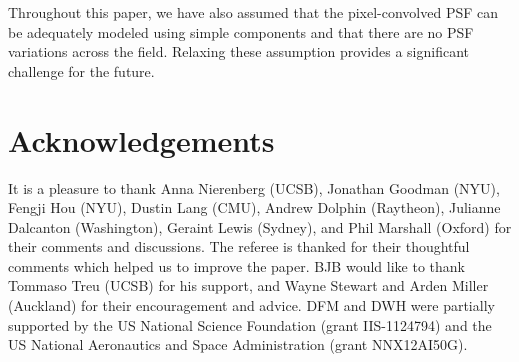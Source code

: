 \documentclass[12pt, preprint]{aastex}
\begin{document}
Throughout this paper, we have also assumed that the pixel-convolved PSF can
be adequately modeled using simple components and that there are no PSF
variations across the field. Relaxing these assumption provides a significant
challenge for the future.



\section{Acknowledgements}
It is a pleasure to thank
  Anna Nierenberg (UCSB),
  Jonathan Goodman (NYU),
  Fengji Hou (NYU),
  Dustin Lang (CMU),
  Andrew Dolphin (Raytheon),
  Julianne Dalcanton (Washington),
  Geraint Lewis (Sydney), and
  Phil Marshall (Oxford)
for their comments and discussions.
The referee is thanked for their thoughtful comments which helped us to improve
the paper.
BJB would like to thank Tommaso Treu (UCSB) for his support, and
Wayne Stewart and Arden Miller (Auckland) for their encouragement and advice.
DFM and DWH were partially supported by
   the US National Science Foundation (grant IIS-1124794) and
   the US National Aeronautics and Space Administration (grant NNX12AI50G).

\appendix
\end{document}
